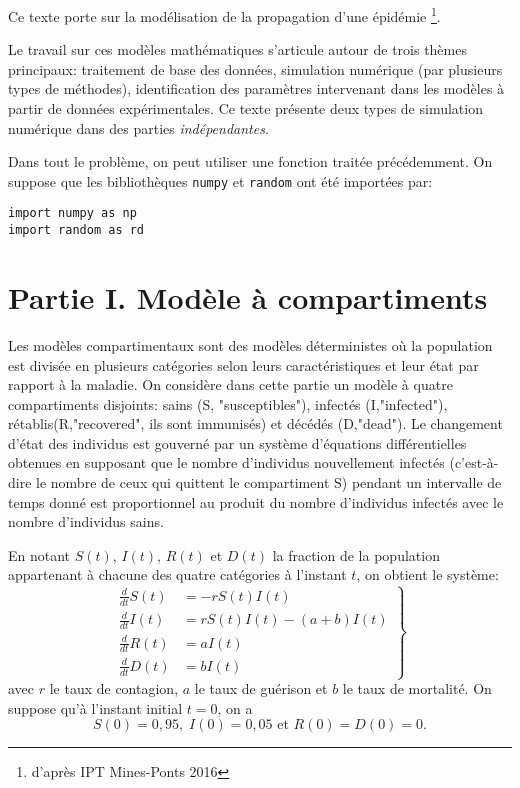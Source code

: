 Ce texte porte sur la mod\'elisation de la propagation d'une \'epid\'emie \footnote{d'après IPT Mines-Ponts 2016}.

Le travail sur ces mod\`eles math\'ematiques s'articule autour de trois th\`emes principaux: traitement de base des donn\'ees, simulation num\'erique (par plusieurs types de m\'ethodes), identification des param\`etres intervenant dans les mod\`eles \`a partir de donn\'ees exp\'erimentales. Ce texte présente deux types de simulation numérique dans des parties \textit{ind\'ependantes}.

Dans tout le probl\`eme, on peut utiliser une fonction trait\'ee pr\'ec\'edemment. On suppose que les biblioth\`eques \texttt{numpy} et \texttt{random} ont \'et\'e import\'ees par:
\begin{verbatim}
import numpy as np
import random as rd
\end{verbatim}

\section*{Partie I. Mod\`ele \`a compartiments}
Les mod\`eles compartimentaux sont des mod\`eles d\'eterministes o\`u la population est divis\'ee en plusieurs cat\'egories selon leurs caract\'eristiques et leur \'etat par rapport \`a la maladie. On consid\`ere dans cette partie un mod\`ele \`a quatre compartiments disjoints: sains (S, "susceptibles"), infect\'es (I,"infected"), r\'etablis(R,"recovered", ils sont immunis\'es) et d\'ec\'ed\'es (D,"dead"). Le changement d'\'etat des individus est gouvern\'e par un syst\`eme d'\'equations diff\'erentielles obtenues en supposant que le nombre d'individus nouvellement infect\'es (c'est-\`a-dire le nombre de ceux qui quittent le compartiment S) pendant un intervalle de temps donn\'e est proportionnel au produit du nombre d'individus infect\'es avec le nombre d'individus sains.

En notant $S(t)$, $I(t)$, $R(t)$ et $D(t)$ la fraction de la population appartenant \`a chacune des quatre cat\'egories \`a l'instant $t$, on obtient le syst\`eme:
\begin{equation}\label{eq1}
\left. \begin{aligned}
\frac{d}{dt}S(t) & =  -rS(t)I(t) \\
\frac{d}{dt}I(t) & =  rS(t)I(t)-(a+b)I(t)\\
\frac{d}{dt}R(t) & =  a I(t) \\
\frac{d}{dt}D(t) & =  bI(t)
\end{aligned} \right\}
\end{equation}
avec $r$ le taux de contagion, $a$ le taux de gu\'erison et $b$ le taux de mortalit\'e. On suppose qu'\`a l'instant initial $t=0$, on a 
\[
S(0)=0,95,\; I(0)=0,05 \text{ et } R(0) = D(0) = 0. 
\]

